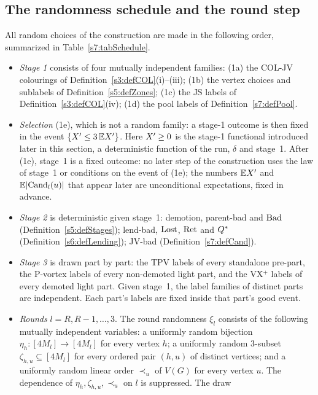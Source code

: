 \subsection{The randomness schedule and the round step}

\begin{definition}\label{s7:defSchedule}
All random choices of the construction are made in the following order,
summarized in Table~\ref{s7:tabSchedule}.
\begin{itemize}
\item \emph{Stage 1} consists of four mutually independent families:
(1a) the COL-JV colourings of Definition~\ref{s3:defCOL}(i)--(iii);
(1b) the vertex choices and sublabels of Definition~\ref{s5:defZones};
(1c) the JS labels of Definition~\ref{s3:defCOL}(iv);
(1d) the pool labels of Definition~\ref{s7:defPool}.
\item \emph{Selection} (1e), which is not a random family: a stage-1 outcome is
then fixed in the event $\{X'\le3\,\mathbb{E}X'\}$. Here
$X'\ge0$ is the stage-1 functional introduced later in this section, a
deterministic function of the run, $\delta$ and stage~1. After (1e), stage~1 is
a fixed outcome: no later step of the construction uses the law of stage~1 or
conditions on the event of (1e); the numbers $\mathbb{E}X'$ and $\mathbb{E}|\mathrm{Cand}_l(u)|$
that appear later are unconditional expectations, fixed in advance.
\item \emph{Stage 2} is deterministic given stage~1: demotion, parent-bad and
$\mathrm{Bad}$ (Definition~\ref{s5:defStages}); lend-bad, $\mathrm{Lost}$, $\mathrm{Ret}$ and $Q^{*}$
(Definition~\ref{s6:defLending}); JV-bad (Definition~\ref{s7:defCand}).
\item \emph{Stage 3} is drawn part by part: the TPV labels of every standalone
pre-part, the P-vortex labels of every non-demoted light part, and the VX$^+$
labels of every demoted light part. Given stage~1, the label families of distinct
parts are independent. Each part's labels are fixed inside that part's good event.
\item \emph{Rounds} $l=R,R-1,\dots,3$. The round randomness $\xi_l$ consists of
the following mutually independent variables:
a uniformly random bijection $\eta_h:[4M_l]\to[4M_l]$ for every vertex $h$;
a uniformly random $3$-subset $\zeta_{h,u}\subseteq[4M_l]$ for every ordered pair
$(h,u)$ of distinct vertices;
and a uniformly random linear order $\prec_u$ of $V(G)$ for every vertex $u$.
The dependence of $\eta_h,\zeta_{h,u},\prec_u$ on $l$ is suppressed. The draw

\end{itemize}
\end{definition}
